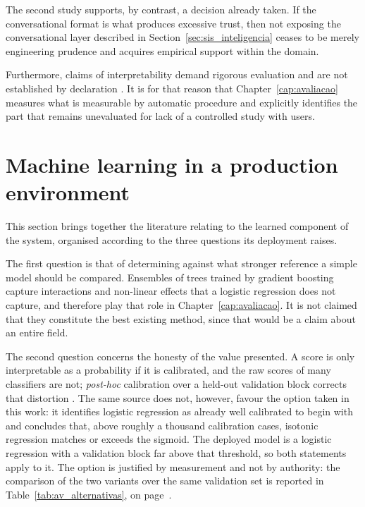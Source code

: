The second study supports, by contrast, a decision already taken. If the conversational format is
what produces excessive trust, then not exposing the conversational layer described in
Section~\ref{sec:sis_inteligencia} ceases to be merely engineering prudence and acquires empirical
support within the domain.

Furthermore, claims of interpretability demand rigorous evaluation and are not established by
declaration \autocite{doshivelez2018considerations}. It is for that reason that
Chapter~\ref{cap:avaliacao} measures what is measurable by automatic procedure and explicitly
identifies the part that remains unevaluated for lack of a controlled study with users.

\section{Machine learning in a production environment}
\label{sec:ctx_producao}

This section brings together the literature relating to the learned component of the system,
organised according to the three questions its deployment raises.

The first question is that of determining against what stronger reference a simple model should be
compared. Ensembles of trees trained by gradient boosting \autocite{friedman2001gbm} capture
interactions and non-linear effects that a logistic regression does not capture, and therefore play
that role in Chapter~\ref{cap:avaliacao}. It is not claimed that they constitute the best existing
method, since that would be a claim about an entire field.

The second question concerns the honesty of the value presented. A score is only interpretable as a
probability if it is calibrated, and the raw scores of many classifiers are not; \emph{post-hoc}
calibration over a held-out validation block corrects that distortion
\autocite{niculescu2005calibration}. The same source does not, however, favour the option taken in
this work: it identifies logistic regression as already well calibrated to begin with and concludes
that, above roughly a thousand calibration cases, isotonic regression matches or exceeds the
sigmoid. The deployed model is a logistic regression with a validation block far above that
threshold, so both statements apply to it. The option is justified by measurement and not by
authority: the comparison of the two variants over the same validation set is reported in
Table~\ref{tab:av_alternativas}, on page~\pageref{tab:av_alternativas}.

